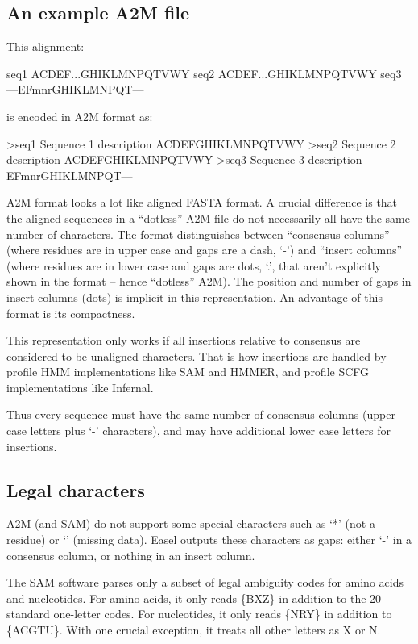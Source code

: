 \subsection{An example A2M file}

This alignment:

\begin{sreoutput}
seq1  ACDEF...GHIKLMNPQTVWY
seq2  ACDEF...GHIKLMNPQTVWY
seq3  ---EFmnrGHIKLMNPQT---
\end{sreoutput}

\noindent 
is encoded in A2M format as:

\begin{sreoutput}
>seq1  Sequence 1 description
ACDEFGHIKLMNPQTVWY
>seq2  Sequence 2 description
ACDEFGHIKLMNPQTVWY
>seq3  Sequence 3 description
---EFmnrGHIKLMNPQT---
\end{sreoutput}

A2M format looks a lot like aligned FASTA format. A crucial difference
is that the aligned sequences in a ``dotless'' A2M file do not
necessarily all have the same number of characters. The format
distinguishes between ``consensus columns'' (where residues are in
upper case and gaps are a dash, `-') and ``insert columns'' (where
residues are in lower case and gaps are dots, `.', that aren't
explicitly shown in the format -- hence ``dotless'' A2M). The position
and number of gaps in insert columns (dots) is implicit in this
representation.  An advantage of this format is its compactness.

This representation only works if all insertions relative to consensus
are considered to be unaligned characters. That is how insertions are
handled by profile HMM implementations like SAM and HMMER, and profile
SCFG implementations like Infernal.

Thus every sequence must have the same number of consensus columns
(upper case letters plus `-' characters), and may have additional lower
case letters for insertions.

\subsection{Legal characters}

A2M (and SAM) do not support some special characters such as `*'
(not-a-residue) or `\mono{\~}' (missing data). Easel outputs these
characters as gaps: either `-' in a consensus column, or nothing in an
insert column.

The SAM software parses only a subset of legal ambiguity codes for
amino acids and nucleotides. For amino acids, it only reads \{BXZ\} in
addition to the 20 standard one-letter codes. For nucleotides, it only
reads \{NRY\} in addition to \{ACGTU\}. With one crucial exception, it
treats all other letters as X or N. 

